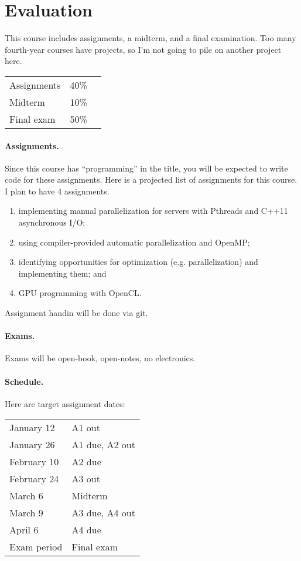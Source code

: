 \documentclass{article}
\begin{document}
\newpage
\section*{Evaluation}
This course includes assignments, a midterm, and a final
examination. Too many fourth-year courses have projects, so I'm not
going to pile on another project here.

\begin{tabular}{lrl}
Assignments & 40\% \\
Midterm & 10\% \\
Final exam & 50\% \\
\end{tabular}

\paragraph{Assignments.} Since this course has ``programming'' in the 
title, you will be expected to write code for these assignments.  Here
is a projected list of assignments for this course. I plan to have 4
assignments.
\begin{enumerate}
\item implementing manual parallelization for servers with Pthreads and C++11 asynchronous I/O;
\item using compiler-provided automatic parallelization and OpenMP;
\item identifying opportunities for optimization (e.g. parallelization) and implementing them; and
\item GPU programming with OpenCL.
\end{enumerate}
Assignment handin will be done via git.

\paragraph{Exams.} Exams will be open-book, open-notes, no electronics.

\paragraph{Schedule.} 
Here are target assignment dates:

\begin{tabular}{ll}
January 12  & A1 out\\
January 26  & A1 due, A2 out\\
February 10 & A2 due\\
February 24 & A3 out\\
March 6 & Midterm\\
March 9    & A3 due, A4 out\\
April 6    & A4 due\\
Exam period & Final exam
\end{tabular}
\end{document}
